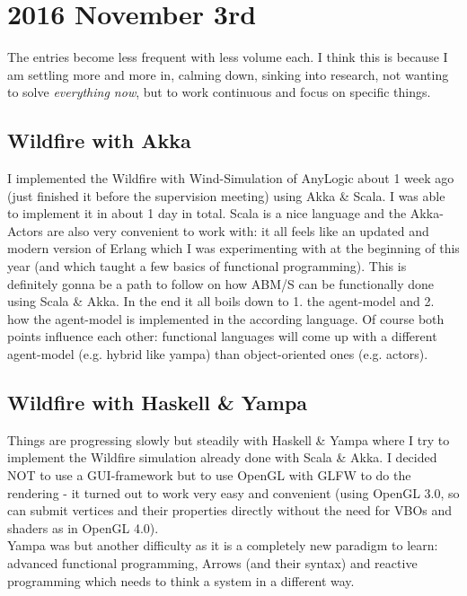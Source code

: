 \section*{2016 November 3rd}
The entries become less frequent with less volume each. I think this is because I am settling more and more in, calming down, sinking into research, not wanting to solve \textit{everything now}, but to work continuous and focus on specific things.

\subsection*{Wildfire with Akka}
I implemented the Wildfire with Wind-Simulation of AnyLogic about 1 week ago (just finished it before the supervision meeting) using Akka \& Scala. I was able to implement it in about 1 day in total. Scala is a nice language and the Akka-Actors are also very convenient to work with: it all feels like an updated and modern version of Erlang which I was experimenting with at the beginning of this year (and which taught a few basics of functional programming). This is definitely gonna be a path to follow on how ABM/S can be functionally done using Scala \& Akka. In the end it all boils down to 1. the agent-model and 2. how the agent-model is implemented in the according language. Of course both points influence each other: functional languages will come up with a different agent-model (e.g. hybrid like yampa) than object-oriented ones (e.g. actors).

\subsection*{Wildfire with Haskell \& Yampa}
Things are progressing slowly but steadily with Haskell \& Yampa where I try to implement the Wildfire simulation already done with Scala \& Akka. I decided NOT to use a GUI-framework but to use OpenGL with GLFW to do the rendering - it turned out to work very easy and convenient (using OpenGL 3.0, so can submit vertices and their properties directly without the need for VBOs and shaders as in OpenGL 4.0). \\
Yampa was but another difficulty as it is a completely new paradigm to learn: advanced functional programming, Arrows (and their syntax) and reactive programming which needs to think a system in a different way.